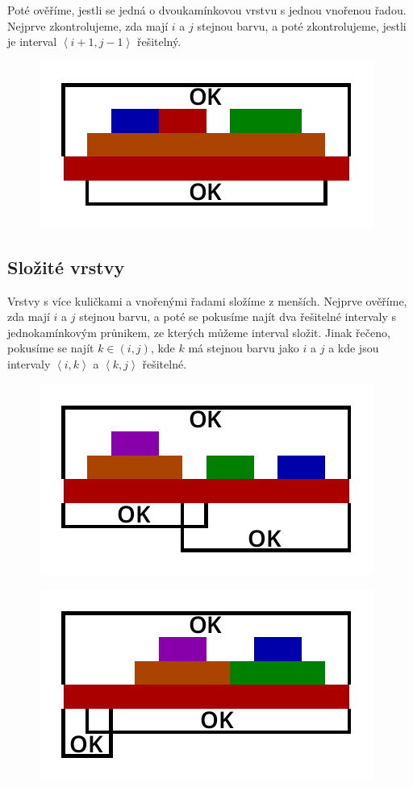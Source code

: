 \documentclass{article}
\begin{document}
Poté ověříme, jestli se jedná o dvoukamínkovou vrstvu s jednou vnořenou řadou. Nejprve zkontrolujeme, zda mají $i$ a $j$ stejnou barvu, a poté zkontrolujeme, jestli je interval $\left<i + 1, j - 1\right>$ řešitelný.

\begin{figure}[H]
    \centering
    \includegraphics[scale=1]{solve-simple-layer.pdf}
\end{figure}

\subsection{Složité vrstvy}

Vrstvy s více kuličkami a vnořenými řadami složíme z menších. Nejprve ověříme, zda mají $i$ a $j$ stejnou barvu, a poté se pokusíme najít dva řešitelné intervaly s jednokamínkovým průnikem, ze kterých můžeme interval složit. Jinak řečeno, pokusíme se najít $k \in \left(i, j\right)$, kde $k$ má stejnou barvu jako $i$ a $j$ a kde jsou intervaly $\left<i, k\right>$ a $\left<k, j\right>$ řešitelné.

\begin{figure}[H]
    \centering
    \includegraphics[scale=1]{solve-complex-layer.pdf}
\end{figure}

\begin{figure}[H]
    \centering
    \includegraphics[scale=1]{solve-extended-layer.pdf}
\end{figure}
\end{document}
